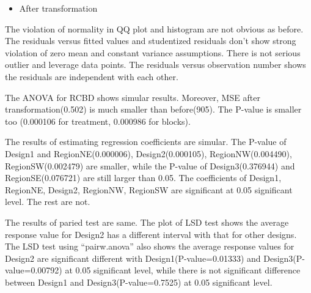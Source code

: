 \documentclass[]{article}
\providecommand{\tightlist}{%
  \setlength{\itemsep}{0pt}\setlength{\parskip}{0pt}}
\begin{document}
\begin{itemize}
\tightlist
\item
  After transformation
\end{itemize}

The violation of normality in QQ plot and histogram are not obvious as
before. The residuals versus fitted values and studentized residuals
don't show strong violation of zero mean and constant variance
assumptions. There is not serious outlier and leverage data points. The
residuals versus observation number shows the residuals are independent
with each other.

The ANOVA for RCBD shows simular results. Moreover, MSE after
transformation(0.502) is much smaller than before(905). The P-value is
smaller too (0.000106 for treatment, 0.000986 for blocks).

The results of estimating regression coefficients are simular. The
P-value of Design1 and RegionNE(0.000006), Design2(0.000105),
RegionNW(0.004490), RegionSW(0.002479) are smaller, while the P-value of
Design3(0.376944) and RegionSE(0.076721) are still larger than 0.05. The
coefficients of Design1, RegionNE, Design2, RegionNW, RegionSW are
significant at 0.05 significant level. The rest are not.

The results of paried test are same. The plot of LSD test shows the
average response value for Design2 has a different interval with that
for other designs. The LSD test using ``pairw.anova'' also shows the
average response values for Design2 are significant different with
Design1(P-value=0.01333) and Design3(P-value=0.00792) at 0.05
significant level, while there is not significant difference between
Design1 and Design3(P-value=0.7525) at 0.05 significant level.
\end{document}
